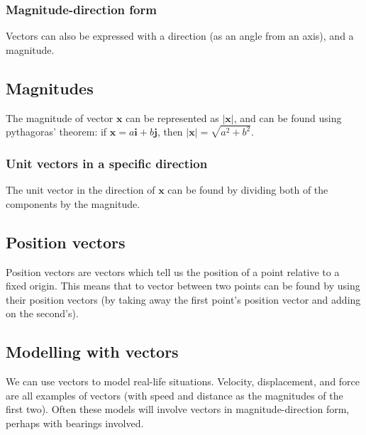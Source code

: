 \subsubsection{Magnitude-direction form}
Vectors can also be expressed with a direction (as an angle from an axis), and a magnitude.

\subsection{Magnitudes}
The magnitude of vector $\textbf{x}$ can be represented as $|\textbf{x}|$, and can be found using pythagoras' theorem: if $\textbf{x}=a\textbf{i}+b\textbf{j}$, then $|\textbf{x}|=\sqrt{a^2+b^2}$.

\subsubsection{Unit vectors in a specific direction}
The unit vector in the direction of $\textbf{x}$ can be found by dividing both of the components by the magnitude.

\subsection{Position vectors}
Position vectors are vectors which tell us the position of a point relative to a fixed origin. This means that to vector between two points can be found by using their position vectors (by taking away the first point's position vector and adding on the second's).

\subsection{Modelling with vectors}
We can use vectors to model real-life situations. Velocity, displacement, and force are all examples of vectors (with speed and distance as the magnitudes of the first two). Often these models will involve vectors in magnitude-direction form, perhaps with bearings involved.
